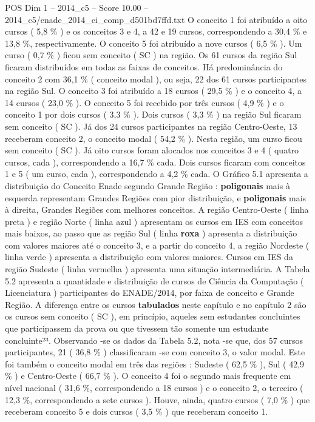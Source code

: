 \begin{textsample}{POS Dim 1 – 2014\_c5 – Score 10.00 – 2014\_c5/enade\_2014\_ci\_comp\_d501bd7ffd.txt}
O conceito 1 foi atribuído a oito cursos ( 5,8 \% ) e os conceitos 3 e 4, a 42 e 19 cursos, correspondendo a 30,4 \% e 13,8 \%, respectivamente.
O conceito 5 foi atribuído a nove cursos ( 6,5 \% ).
Um curso ( 0,7 \% ) ficou sem conceito ( SC ) na região.
Os 61 cursos da região Sul ficaram distribuídos em todas as faixas de conceitos.
Há predominância do conceito 2 com 36,1 \% ( conceito modal ), ou seja, 22 dos 61 cursos participantes na região Sul.
O conceito 3 foi atribuído a 18 cursos ( 29,5 \% ) e o conceito 4, a 14 cursos ( 23,0 \% ).
O conceito 5 foi recebido por três cursos ( 4,9 \% ) e o conceito 1 por dois cursos ( 3,3 \% ).
Dois cursos ( 3,3 \% ) na região Sul ficaram sem conceito ( SC ).
Já dos 24 cursos participantes na região Centro-Oeste, 13 receberam conceito 2, o conceito modal ( 54,2 \% ).
Nesta região, um curso ficou sem conceito ( SC ).
Já oito cursos foram alocados nos conceitos 3 e 4 ( quatro cursos, cada ), correspondendo a 16,7 \% cada.
Dois cursos ficaram com conceitos 1 e 5 ( um curso, cada ), correspondendo a 4,2 \% cada.
O Gráfico 5.1 apresenta a distribuição do Conceito Enade segundo Grande Região : \textbf{poligonais} mais à esquerda representam Grandes Regiões com pior distribuição, e \textbf{poligonais} mais à direita, Grandes Regiões com melhores conceitos.
A região Centro-Oeste ( linha preta ) e região Norte ( linha azul ) apresentam os cursos em IES com conceitos mais baixos, ao passo que as região Sul ( linha \textbf{roxa} ) apresenta a distribuição com valores maiores até o conceito 3, e a partir do conceito 4, a região Nordeste ( linha verde ) apresenta a distribuição com valores maiores.
Cursos em IES da região Sudeste ( linha vermelha ) apresenta uma situação intermediária.
A Tabela 5.2 apresenta a quantidade e distribuição de cursos de Ciência da Computação ( Licenciatura ) participantes do ENADE/2014, por faixa de conceito e Grande Região.
A diferença entre os cursos \textbf{tabulados} neste capítulo e no capítulo 2 são os cursos sem conceito ( SC ), em princípio, aqueles sem estudantes concluintes que participassem da prova ou que tivessem tão somente um estudante concluinte²³.
Observando -se os dados da Tabela 5.2, nota -se que, dos 57 cursos participantes, 21 ( 36,8 \% ) classificaram -se com conceito 3, o valor modal.
Este foi também o conceito modal em três das regiões : Sudeste ( 62,5 \% ), Sul ( 42,9 \% ) e Centro-Oeste ( 66,7 \% ).
O conceito 4 foi o segundo mais frequente em nível nacional ( 31,6 \%, correspondendo a 18 cursos ) e o conceito 2, o terceiro ( 12,3 \%, correspondendo a sete cursos ).
Houve, ainda, quatro cursos ( 7,0 \% ) que receberam conceito 5 e dois cursos ( 3,5 \% ) que receberam conceito 1.

\end{textsample}
